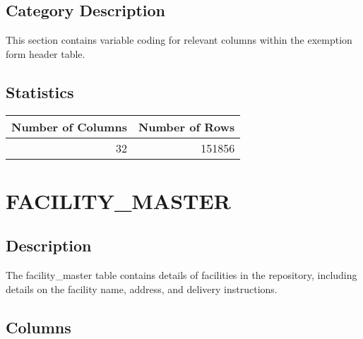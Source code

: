 \documentclass[
  letterpaper,
  DIV=11,
  numbers=noendperiod]{scrreprt}
\begin{document}
\hypertarget{category-description-9}{%
\section*{Category Description}\label{category-description-9}}

This section contains variable coding for relevant columns within the
exemption form header table.

\hypertarget{statistics-9}{%
\section*{Statistics}\label{statistics-9}}

\begin{longtable}{rr}
\toprule
Number of Columns & Number of Rows \\ 
\midrule
32 & 151856 \\ 
\bottomrule
\end{longtable}

\hypertarget{facility_master}{%
\chapter*{FACILITY\_MASTER}\label{facility_master}}

\hypertarget{description-10}{%
\section*{Description}\label{description-10}}

The facility\_master table contains details of facilities in the
repository, including details on the facility name, address, and
delivery instructions.

\hypertarget{columns-10}{%
\section*{Columns}\label{columns-10}}
\end{document}
